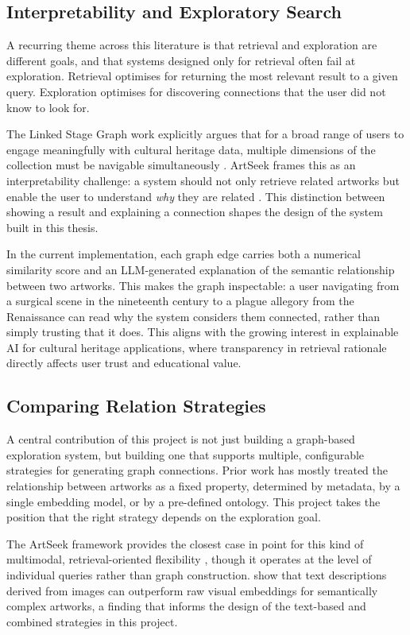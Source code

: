 \documentclass[12pt, a4paper]{article}
\begin{document}
\subsection{Interpretability and Exploratory Search}

A recurring theme across this literature is that retrieval and exploration are different goals, and
that systems designed only for retrieval often fail at exploration. Retrieval optimises for returning
the most relevant result to a given query. Exploration optimises for discovering connections that
the user did not know to look for.

The Linked Stage Graph work explicitly argues that for a broad range of users to engage
meaningfully with cultural heritage data, multiple dimensions of the collection must be navigable
simultaneously \citep{tietz2020}. ArtSeek frames this as an interpretability challenge: a system
should not only retrieve related artworks but enable the user to understand \emph{why} they are
related \citep{fanelli2025}. This distinction between showing a result and explaining a connection
shapes the design of the system built in this thesis.

In the current implementation, each graph edge carries both a numerical similarity score and an
LLM-generated explanation of the semantic relationship between two artworks. This makes the
graph inspectable: a user navigating from a surgical scene in the nineteenth century to a plague
allegory from the Renaissance can read why the system considers them connected, rather than
simply trusting that it does. This aligns with the growing interest in explainable AI for cultural
heritage applications, where transparency in retrieval rationale directly affects user trust and
educational value.

\subsection{Comparing Relation Strategies}

A central contribution of this project is not just building a graph-based exploration system, but
building one that supports multiple, configurable strategies for generating graph connections.
Prior work has mostly treated the relationship between artworks as a fixed property, determined
by metadata, by a single embedding model, or by a pre-defined ontology. This project takes the
position that the right strategy depends on the exploration goal.

The ArtSeek framework provides the closest case in point for this kind of multimodal,
retrieval-oriented flexibility \citep{fanelli2025}, though it operates at the level of individual
queries rather than graph construction. \citet{zhang2026} show that text descriptions derived from
images can outperform raw visual embeddings for semantically complex artworks, a finding that
informs the design of the text-based and combined strategies in this project.
\end{document}
